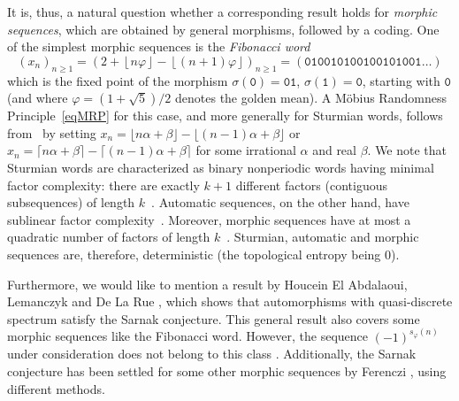 \documentclass[12pt]{amsart}
\begin{document}
It is, thus, a natural question whether a corresponding result holds for \emph{morphic sequences},
which are obtained by general morphisms, followed by a coding.
One of the simplest morphic sequences is the \emph{Fibonacci word} 
\[
(x_n)_{n\geq 1} = 
\left( {2+\left\lfloor {{n}\varphi }\right\rfloor -\left\lfloor {\left({n+1}\right)\varphi }\right\rfloor } \right)_{n\geq 1} = 
({\mathtt{0}}{\mathtt{1}}{\mathtt{0}}{\mathtt{0}}{\mathtt{1}}{\mathtt{0}}{\mathtt{1}}{\mathtt{0}}{\mathtt{0}}{\mathtt{1}}{\mathtt{0}}{\mathtt{0}}{\mathtt{1}}{\mathtt{0}}{\mathtt{1}}{\mathtt{0}}{\mathtt{0}}{\mathtt{1}}\ldots)
\]
which is the fixed point of the morphism $\sigma({\mathtt{0}})={\mathtt{0}}{\mathtt{1}}$,
$\sigma({\mathtt{1}})={\mathtt{0}}$, starting with ${\mathtt{0}}$ (and where $\varphi = (1+\sqrt 5)/2$ denotes the golden mean).
A M\"obius Randomness Principle~\eqref{eqMRP} for this case, and more generally for Sturmian words, follows from~\cite[Theorem~5.2]{GT2012} by setting
$x_n = \lfloor n \alpha + \beta \rfloor - \lfloor (n-1) \alpha + \beta \rfloor$ or
$x_n = \lceil n \alpha + \beta \rceil - \lceil (n-1) \alpha + \beta \rceil$ for some irrational $\alpha$ and real $\beta$.
We note that Sturmian words are characterized as binary nonperiodic words having minimal factor complexity: 
there are exactly $k+1$ different factors (contiguous subsequences) of length $k$~\cite[Theorem~10.5.2]{AS2003}.
Automatic sequences, on the other hand, have sublinear factor complexity~\cite[Corollary~10.3.2]{AS2003}.
Moreover, morphic sequences have at most a quadratic number of factors of length $k$~\cite[Corollary~10.4.9]{AS2003}.
Sturmian, automatic and morphic sequences are, therefore, deterministic (the topological entropy being $0$).

Furthermore, we would like to mention a result by Houcein El Abdalaoui, Lemanczyk and De La Rue \cite{ELD2015},
which shows that automorphisms with quasi-discrete spectrum satisfy the Sarnak conjecture. 
This general result also covers some morphic sequences like the Fibonacci word.
However, the sequence $(-1)^{s_\varphi(n)}$ under consideration does not belong to this class \cite{Mariusz_private}.
Additionally, the Sarnak conjecture has been settled for some other morphic sequences 
by Ferenczi \cite{Ferenczi_private}, using different methods.
\end{document}
